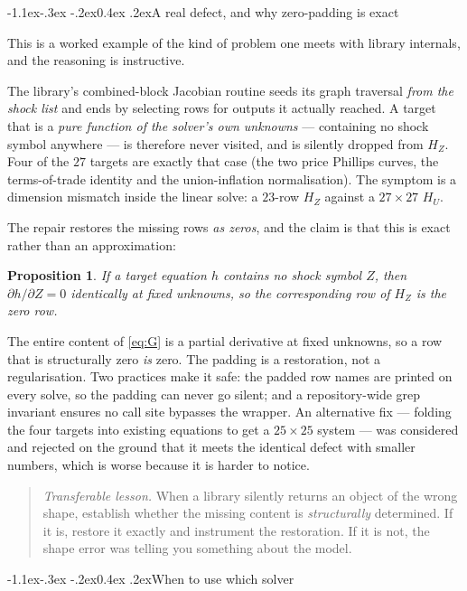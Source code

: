 \documentclass[10pt,a4paper]{article}
\makeatletter
\theoremstyle{definition}
\theoremstyle{plain}
\newtheorem{prop}[defn]{Proposition}
\theoremstyle{remark}
\renewcommand\subsection{\@startsection{subsection}{2}{\z@}%
  {-1.1ex\@plus -.3ex \@minus -.2ex}{0.4ex \@plus .2ex}{\normalfont\normalsize\bfseries}}
\makeatother
\begin{document}
\subsection{A real defect, and why zero-padding is exact}

This is a worked example of the kind of problem one meets with library internals, and the
reasoning is instructive.

The library's combined-block Jacobian routine seeds its graph traversal \emph{from the shock
list} and ends by selecting rows for outputs it actually reached. A target that is a
\emph{pure function of the solver's own unknowns} --- containing no shock symbol anywhere ---
is therefore never visited, and is silently dropped from $H_Z$. Four of the $27$ targets are
exactly that case (the two price Phillips curves, the terms-of-trade identity and the
union-inflation normalisation). The symptom is a dimension mismatch inside the linear solve:
a $23$-row $H_Z$ against a $27\times27$ $H_U$.

The repair restores the missing rows \emph{as zeros}, and the claim is that this is exact
rather than an approximation:
\begin{prop}
If a target equation $h$ contains no shock symbol $Z$, then $\partial h/\partial Z = 0$
identically at fixed unknowns, so the corresponding row of $H_Z$ is the zero row.
\end{prop}
\noindent The entire content of \eqref{eq:G} is a partial derivative at fixed unknowns, so a
row that is structurally zero \emph{is} zero. The padding is a restoration, not a
regularisation. Two practices make it safe: the padded row names are printed on every solve,
so the padding can never go silent; and a repository-wide grep invariant ensures no call site
bypasses the wrapper. An alternative fix --- folding the four targets into existing equations
to get a $25\times25$ system --- was considered and rejected on the ground that it meets the
identical defect with smaller numbers, which is worse because it is harder to notice.

\begin{quote}
\emph{Transferable lesson.} When a library silently returns an object of the wrong shape,
establish whether the missing content is \emph{structurally} determined. If it is, restore it
exactly and instrument the restoration. If it is not, the shape error was telling you
something about the model.
\end{quote}

\subsection{When to use which solver}
\end{document}
